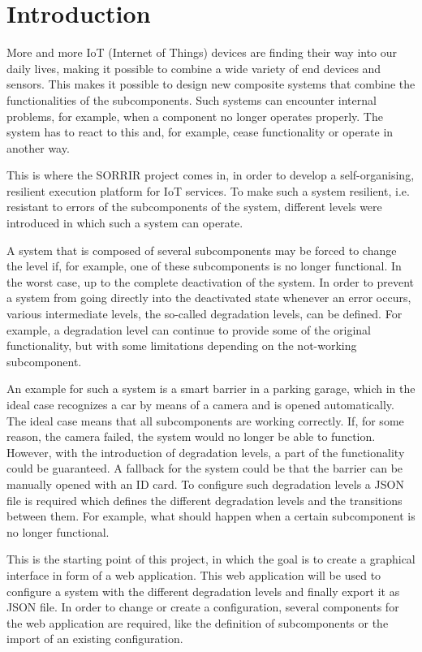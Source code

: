 \chapter{Introduction}
\label{sec:intro}

More and more IoT (Internet of Things) devices are finding their way into our daily lives, making it possible to combine a wide variety of end devices and sensors. This makes it possible to design new composite systems that combine the functionalities of the subcomponents. Such systems can encounter internal problems, for example, when a component no longer operates properly. The system has to react to this and, for example, cease functionality or operate in another way.

This is where the SORRIR project comes in, in order to develop a self-organising, resilient execution platform for IoT services. To make such a system resilient, i.e. resistant to errors of the subcomponents of the system, different levels were introduced in which such a system can operate. 

A system that is composed of several subcomponents may be forced to change the level if, for example, one of these subcomponents is no longer functional. In the worst case, up to the complete deactivation of the system. In order to prevent a system from going directly into the deactivated state whenever an error occurs, various intermediate levels, the so-called degradation levels, can be defined. For example, a degradation level can continue to provide some of the original functionality, but with some limitations depending on the not-working subcomponent.

An example for such a system is a smart barrier in a parking garage, which in the ideal case recognizes a car by means of a camera and is opened automatically. The ideal case means that all subcomponents are working correctly. If, for some reason, the camera failed, the system would no longer be able to function. However, with the introduction of degradation levels, a part of the functionality could be guaranteed. A fallback for the system could be that the barrier can be manually opened with an ID card. To configure such degradation levels a JSON file is required which defines the different degradation levels and the transitions between them. For example, what should happen when a certain subcomponent is no longer functional.

This is the starting point of this project, in which the goal is to create a graphical interface in form of a web application. This web application will be used to configure a system with the different degradation levels and finally export it as JSON file. In order to change or create a configuration, several components for the web application are required, like the definition of subcomponents or the import of an existing configuration. 

